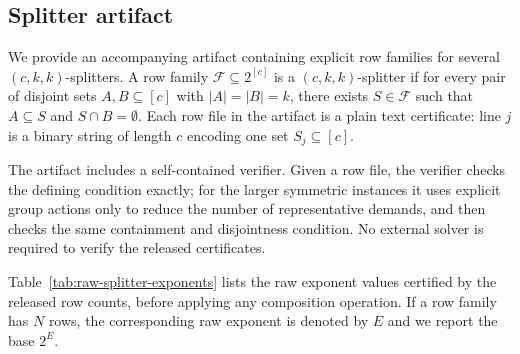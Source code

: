 \subsection{Splitter artifact}
\label{sec:splitter-artifact}

We provide an accompanying artifact containing explicit row families for
several $(c,k,k)$-splitters.  A row family $\mathcal F\subseteq 2^{[c]}$ is a
$(c,k,k)$-splitter if for every pair of disjoint sets $A,B\subseteq[c]$ with
$|A|=|B|=k$, there exists $S\in\mathcal F$ such that $A\subseteq S$ and
$S\cap B=\emptyset$.  Each row file in the artifact is a plain text certificate:
line $j$ is a binary string of length $c$ encoding one set $S_j\subseteq[c]$.

The artifact includes a self-contained verifier.  Given a row file, the verifier
checks the defining condition exactly; for the larger symmetric instances it
uses explicit group actions only to reduce the number of representative demands,
and then checks the same containment and disjointness condition.  No external
solver is required to verify the released certificates.

Table~\ref{tab:raw-splitter-exponents} lists the raw exponent values certified
by the released row counts, before applying any composition operation.  If a
row family has $N$ rows, the corresponding raw exponent is denoted by $E$ and
we report the base $2^E$.

